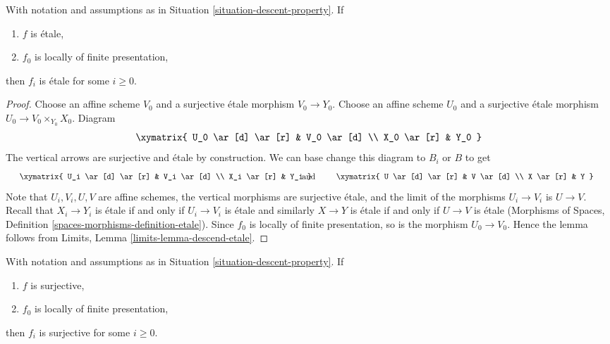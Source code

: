 \begin{lemma}
\label{lemma-descend-etale}
With notation and assumptions as in
Situation \ref{situation-descent-property}. If
\begin{enumerate}
\item $f$ is \'etale,
\item $f_0$ is locally of finite presentation,
\end{enumerate}
then $f_i$ is \'etale for some $i \geq 0$.
\end{lemma}

\begin{proof}
Choose an affine scheme $V_0$ and a surjective \'etale morphism
$V_0 \to Y_0$. Choose an affine scheme $U_0$ and a surjective \'etale
morphism $U_0 \to V_0 \times_{Y_0} X_0$. Diagram
$$
\xymatrix{
U_0 \ar[d] \ar[r] & V_0 \ar[d] \\
X_0 \ar[r] & Y_0
}
$$
The vertical arrows are surjective and \'etale by construction.
We can base change this diagram to $B_i$ or $B$ to get
$$
\vcenter{
\xymatrix{
U_i \ar[d] \ar[r] & V_i \ar[d] \\
X_i \ar[r] & Y_i
}
}
\quad\text{and}\quad
\vcenter{
\xymatrix{
U \ar[d] \ar[r] & V \ar[d] \\
X \ar[r] & Y
}
}
$$
Note that $U_i, V_i, U, V$ are affine schemes,
the vertical morphisms are surjective \'etale, and the limit of the
morphisms $U_i \to V_i$ is $U \to V$. Recall that $X_i \to Y_i$ is \'etale
if and only if $U_i \to V_i$ is
\'etale and similarly $X \to Y$ is \'etale if and only if
$U \to V$ is \'etale
(Morphisms of Spaces, Definition \ref{spaces-morphisms-definition-etale}).
Since $f_0$ is locally of finite
presentation, so is the morphism $U_0 \to V_0$. Hence the lemma follows
from Limits, Lemma \ref{limits-lemma-descend-etale}.
\end{proof}

\begin{lemma}
\label{lemma-descend-surjective}
With notation and assumptions as in
Situation \ref{situation-descent-property}. If
\begin{enumerate}
\item $f$ is surjective,
\item $f_0$ is locally of finite presentation,
\end{enumerate}
then $f_i$ is surjective for some $i \geq 0$.
\end{lemma}

